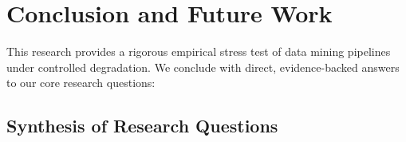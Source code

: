 \documentclass[11pt,a4paper]{article}
\begin{document}
\section{Conclusion and Future Work}
\label{sec:conclusion}

This research provides a rigorous empirical stress test of data mining pipelines under controlled degradation. We conclude with direct, evidence-backed answers to our core research questions:

\subsection{Synthesis of Research Questions}
\label{subsec:synthesis_rq}
\end{document}
